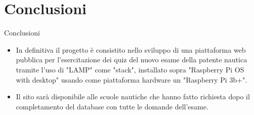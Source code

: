 \documentclass[hidelinks,aspectratio=169]{beamer}
\begin{document}
		\section{Conclusioni}
	\begin{frame}{Conclusioni}
		\begin{itemize}
			\item In definitiva il progetto è consistito nello sviluppo di una piattaforma web pubblica per l'esercitazione dei quiz del nuovo esame della patente nautica tramite l'uso di "LAMP" come "stack", installato sopra "Raspberry Pi OS with desktop" usando come piattaforma hardware un "Raspberry Pi 3b+".
			\item Il sito sarà disponibile alle scuole nautiche che hanno fatto richiesta dopo il completamento del database con tutte le domande dell'esame.
		\end{itemize}
	\end{frame}
	
\end{document}
